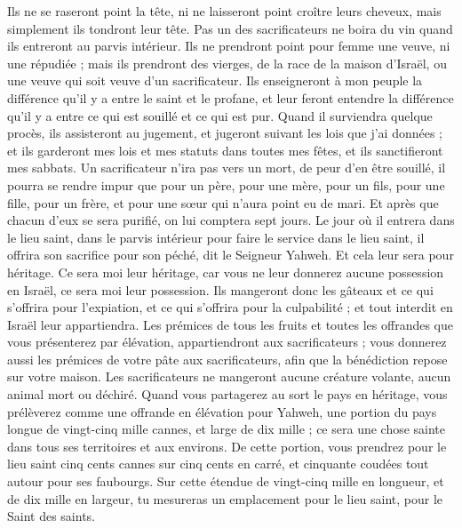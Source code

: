\begin{multicols}{2}
Ils ne se raseront point la tête, ni ne laisseront point croître leurs cheveux, mais simplement ils tondront leur tête.
Pas un des sacrificateurs ne boira du vin quand ils entreront au parvis intérieur.
Ils ne prendront point pour femme une veuve, ni une répudiée ; mais ils prendront des vierges, de la race de la maison d'Israël, ou une veuve qui soit veuve d'un sacrificateur.
Ils enseigneront à mon peuple la différence qu'il y a entre le saint et le profane, et leur feront entendre la différence qu'il y a entre ce qui est souillé et ce qui est pur.
Quand il surviendra quelque procès, ils assisteront au jugement, et jugeront suivant les lois que j'ai données ; et ils garderont mes lois et mes statuts dans toutes mes fêtes, et ils sanctifieront mes sabbats.
Un sacrificateur n'ira pas vers un mort, de peur d'en être souillé, il pourra se rendre impur que pour un père, pour une mère, pour un fils, pour une fille, pour un frère, et pour une sœur qui n'aura point eu de mari.
Et après que chacun d'eux se sera purifié, on lui comptera sept jours.
Le jour où il entrera dans le lieu saint, dans le parvis intérieur pour faire le service dans le lieu saint, il offrira son sacrifice pour son péché, dit le Seigneur Yahweh.
Et cela leur sera pour héritage. Ce sera moi leur héritage, car vous ne leur donnerez aucune possession en Israël, ce sera moi leur possession.
Ils mangeront donc les gâteaux et ce qui s'offrira pour l'expiation, et ce qui s'offrira pour la culpabilité ; et tout interdit en Israël leur appartiendra.
Les prémices de tous les fruits et toutes les offrandes que vous présenterez par élévation, appartiendront aux sacrificateurs ; vous donnerez aussi les prémices de votre pâte aux sacrificateurs, afin que la bénédiction repose sur votre maison.
Les sacrificateurs ne mangeront aucune créature volante, aucun animal mort ou déchiré.
\VerseOne{}Quand vous partagerez au sort le pays en héritage, vous prélèverez comme une offrande en élévation pour Yahweh, une portion du pays longue de vingt-cinq mille cannes, et large de dix mille ; ce sera une chose sainte dans tous ses territoires et aux environs.
De cette portion, vous prendrez pour le lieu saint cinq cents cannes sur cinq cents en carré, et cinquante coudées tout autour pour ses faubourgs.
Sur cette étendue de vingt-cinq mille en longueur, et de dix mille en largeur, tu mesureras un emplacement pour le lieu saint, pour le Saint des saints.

\end{multicols}
